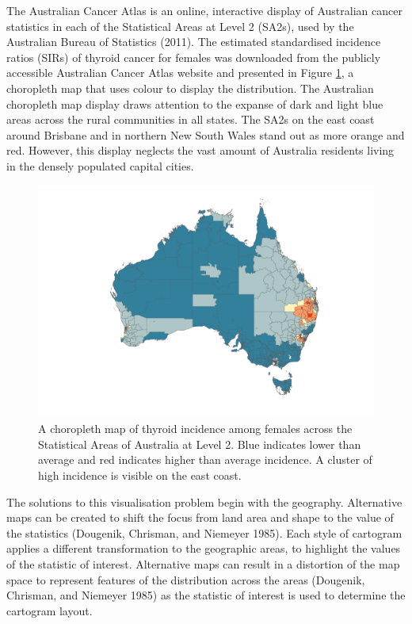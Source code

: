 The Australian Cancer Atlas is an online, interactive display of Australian cancer statistics in each of the Statistical Areas at Level 2 (SA2s), used by the Australian Bureau of Statistics (2011). The estimated standardised incidence ratios (SIRs) of thyroid cancer
for females was downloaded from the publicly accessible Australian Cancer Atlas website and presented in Figure \ref{fig:choro}, a choropleth map that uses colour to display the distribution. The Australian choropleth map display draws attention to the expanse of dark and light blue areas across the rural communities in all states. The SA2s on the east coast around Brisbane and in northern New South Wales stand out as more orange and red. However, this display neglects the vast amount of Australia residents living in the densely populated capital cities.

\begin{figure}
\includegraphics[width=0.95\linewidth]{kobakian-cook_files/figure-latex/choro-1} \caption{A choropleth map of thyroid incidence among females across the Statistical Areas of Australia at Level 2. Blue indicates lower than average and red indicates higher than average incidence. A cluster of high incidence is visible on the east coast.}\label{fig:choro}
\end{figure}

The solutions to this visualisation problem begin with the geography. Alternative maps can be created to shift the focus from land area and shape to the value of the statistics (Dougenik, Chrisman, and Niemeyer 1985). Each style of cartogram applies a different transformation to the geographic areas, to highlight the values of the statistic of interest. Alternative maps can result in a distortion of the map space to represent features of the distribution across the areas (Dougenik, Chrisman, and Niemeyer 1985) as the statistic of interest is used to determine the cartogram layout.

